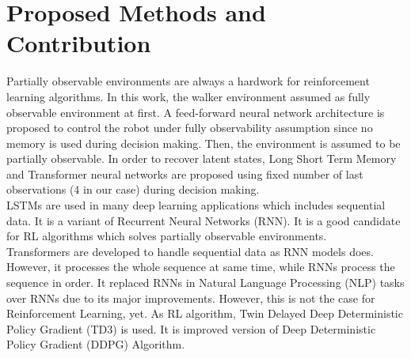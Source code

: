 \section{Proposed Methods and Contribution}
\label{sec:proposedmethods}
Partially observable environments are always a hardwork for reinforcement learning algorithms. In this work, the walker environment assumed as fully observable environment at first. A feed-forward neural network architecture is proposed to control the robot under fully observability assumption since no memory is used during decision making. Then, the environment is assumed to be partially observable. In order to recover latent states, Long Short Term Memory and Transformer neural networks are proposed using fixed number of last observations (4 in our case) during decision making. \\
LSTMs are used in many deep learning applications which includes sequential data. It is a variant of Recurrent Neural Networks (RNN). It is a good candidate for RL algorithms which solves partially observable environments. \\
Transformers are developed to handle sequential data as RNN models does. However, it processes the whole sequence at same time, while RNNs process the sequence in order. It replaced RNNs in Natural Language Processing (NLP) tasks over RNNs due to its major improvements. However, this is not the case for Reinforcement Learning, yet.
As RL algorithm, Twin Delayed Deep Deterministic Policy Gradient (TD3) is used. It is improved version of Deep Deterministic Policy Gradient (DDPG) Algorithm.
